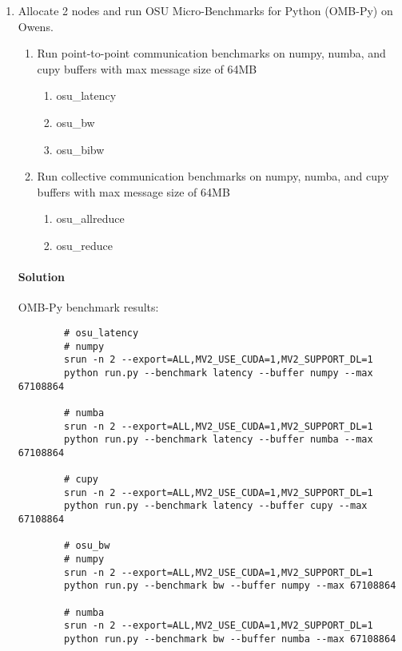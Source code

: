 \documentclass[12pt]{article}
\begin{document}
\begin{enumerate}
\begin{enumerate}
    \item Allocate 2 nodes and run OSU Micro-Benchmarks for Python 
            (OMB-Py) on Owens. 
        \begin{enumerate}
            \item Run point-to-point communication benchmarks on numpy, numba, 
                    and cupy buffers with max message size of 64MB  
                \begin{enumerate}
                    \item osu\_latency
                    \item osu\_bw
                    \item osu\_bibw
                \end{enumerate}
            \item Run collective communication benchmarks on numpy, numba, and 
                    cupy buffers with max message size of 64MB 
                \begin{enumerate}
                    \item osu\_allreduce
                    \item osu\_reduce
                \end{enumerate}
        \end{enumerate}

    \paragraph[short]{Solution} OMB-Py benchmark results:

    \begin{verbatim}
        # osu_latency
        # numpy
        srun -n 2 --export=ALL,MV2_USE_CUDA=1,MV2_SUPPORT_DL=1 
        python run.py --benchmark latency --buffer numpy --max 67108864
    
        # numba
        srun -n 2 --export=ALL,MV2_USE_CUDA=1,MV2_SUPPORT_DL=1 
        python run.py --benchmark latency --buffer numba --max 67108864

        # cupy
        srun -n 2 --export=ALL,MV2_USE_CUDA=1,MV2_SUPPORT_DL=1 
        python run.py --benchmark latency --buffer cupy --max 67108864

        # osu_bw
        # numpy
        srun -n 2 --export=ALL,MV2_USE_CUDA=1,MV2_SUPPORT_DL=1 
        python run.py --benchmark bw --buffer numpy --max 67108864
    
        # numba
        srun -n 2 --export=ALL,MV2_USE_CUDA=1,MV2_SUPPORT_DL=1 
        python run.py --benchmark bw --buffer numba --max 67108864


\end{verbatim}
\end{enumerate}
\end{enumerate}
\end{document}
